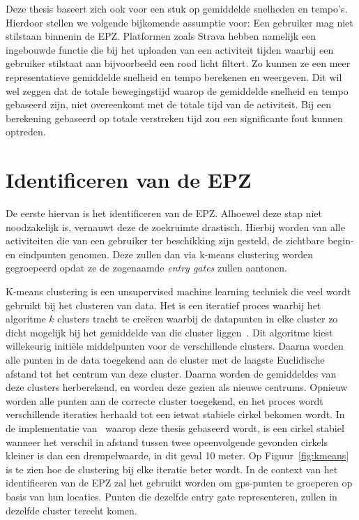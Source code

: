 Deze thesis baseert zich ook voor een stuk op gemiddelde snelheden en tempo's.
Hierdoor stellen we volgende bijkomende assumptie voor: Een gebruiker mag niet
stilstaan binnenin de \ac{EPZ}. Platformen zoals Strava hebben namelijk een
ingebouwde functie die bij het uploaden van een activiteit tijden waarbij een
gebruiker stilstaat aan bijvoorbeeld een rood licht filtert. Zo kunnen ze een
meer representatieve gemiddelde snelheid en tempo berekenen en weergeven. Dit
wil wel zeggen dat de totale bewegingstijd waarop de gemiddelde snelheid en
tempo gebaseerd zijn, niet overeenkomt met de totale tijd van de activiteit.
Bij een berekening gebaseerd op totale verstreken tijd zou een significante
fout kunnen optreden.

\section{Identificeren van de EPZ}
De eerste hiervan is het identificeren van de \ac{EPZ}. Alhoewel deze stap niet
noodzakelijk is, vernauwt deze de zoekruimte drastisch. Hierbij worden van alle
activiteiten die van een gebruiker ter beschikking zijn gesteld, de zichtbare
begin- en eindpunten genomen. Deze zullen dan via k-means clustering worden
gegroepeerd opdat ze de zogenaamde \textit{entry gates} zullen aantonen.

K-means clustering is een unsupervised machine learning techniek die veel wordt
gebruikt bij het clusteren van data. Het is een iteratief proces waarbij het
algoritme $k$ clusters tracht te creëren waarbij de datapunten in elke cluster
zo dicht mogelijk bij het gemiddelde van die cluster
liggen~\cite{Understa24:online}. Dit algoritme kiest willekeurig initiële
middelpunten voor de verschillende clusters. Daarna worden alle punten in de
data toegekend aan de cluster met de laagste Euclidische afstand tot het
centrum van deze cluster. Daarna worden de gemiddeldes van deze clusters
herberekend, en worden deze gezien als nieuwe centrums. Opnieuw worden alle
punten aan de correcte cluster toegekend, en het proces wordt verschillende
iteraties herhaald tot een ietwat stabiele cirkel bekomen wordt. In de
implementatie van~\citeauthor{Dhondt_Pochat_Voulimeneas_Joosen_Volckaert_2022}
waarop deze thesis gebaseerd wordt, is een cirkel stabiel wanneer het verschil
in afstand tussen twee opeenvolgende gevonden cirkels kleiner is dan een
drempelwaarde, in dit geval 10
meter\cite{Dhondt_Pochat_Voulimeneas_Joosen_Volckaert_2022, Verdonck_2022}. Op
Figuur~\ref{fig:kmeans} is te zien hoe de clustering bij elke iteratie beter
wordt. In de context van het identificeren van de \ac{EPZ} zal het gebruikt
worden om \ac{gps}-punten te groeperen op basis van hun locaties. Punten die
dezelfde entry gate representeren, zullen in dezelfde cluster terecht komen.

